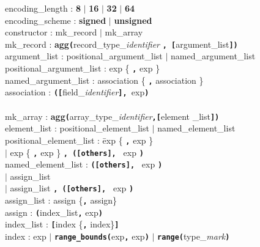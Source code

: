 \documentclass{article}
\begin{document}
\begin{tabbing}
encoding\_length : \textbf{8} $\mid$ \textbf{16} $\mid$ \textbf{32} $\mid$
\textbf{64} \\
encoding\_scheme : \textbf{signed} $\mid$ \textbf{unsigned} \\
constructor : mk\_record $\mid$ mk\_array \\

mk\_record : \textbf{agg\texttt{(}}record\_type\_\textit{identifier}
\textbf{\texttt{, [}}argument\_list\textbf{\texttt{])}} \\

argument\_list : positional\_argument\_list $\mid$ named\_argument\_list \\
positional\_argument\_list : exp \{ \textbf{\texttt{,}} exp \} \\
named\_argument\_list : association \{ \textbf{\texttt{,}} association \} \\

association : \textbf{\texttt{([}}field\_\textit{identifier}\textbf{\texttt{],
}}exp\textbf{\texttt{)}} \\
\\
mk\_array :
\textbf{agg\texttt{(}}array\_type\_\textit{identifier}\textbf{\texttt{,[}}element
\_list\textbf{\texttt{])}} \\
element\_list : positional\_element\_list $\mid$ named\_element\_list \\
positional\_element\_list : \= exp \{ \textbf{\texttt{,}} exp \} \\
                            \> $\mid$ exp \{ \textbf{\texttt{,}} exp \}
\textbf{\texttt{, ([others], }} exp
                            \textbf{\texttt{)}} \\
named\_element\_list : \= \textbf{\texttt{([others], }} exp \textbf{\texttt{)}}
\\
                       \> $\mid$ assign\_list \\
                       \> $\mid$ assign\_list \textbf{\texttt{, ([others], }} exp
\textbf{\texttt{)}} \\
assign\_list : assign \{\textbf{\texttt{,}} assign\} \\
assign : \textbf{\texttt{(}}index\_list\textbf{\texttt{,}} exp\textbf{\texttt{)}}
\\
index\_list : \textbf{\texttt{[}}index \{\textbf{\texttt{,}}
index\}\textbf{\texttt{]}} \\
index : exp $\mid$ \textbf{\texttt{range\_bounds(}}exp\textbf{\texttt{,}}
exp\textbf{\texttt{)}} $\mid$
\textbf{\texttt{range(}}type\_\textit{mark}\textbf{\texttt{)}}\\
\\


\end{tabbing}
\end{document}
